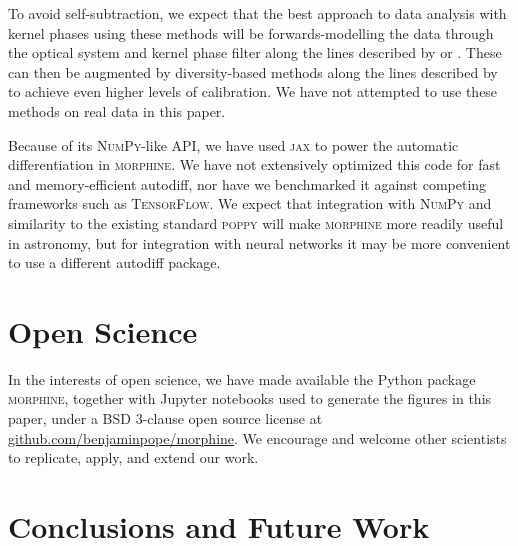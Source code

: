 \documentclass[modern]{aastex63}
\begin{document}
To avoid self-subtraction, we expect that the best approach to data analysis with kernel phases using these methods will be forwards-modelling the data through the optical system and kernel phase filter along the lines described by \citet{pueyo16} or \citet{martinache20}. These can then be augmented by diversity-based methods along the lines described by \citet{ireland13} to achieve even higher levels of calibration. We have not attempted to use these methods on real data in this paper.


Because of its \textsc{NumPy}-like API, we have used \textsc{jax} to power the automatic differentiation in \textsc{morphine}. We have not extensively optimized this code for fast and memory-efficient autodiff, nor have we benchmarked it against competing frameworks such as \textsc{TensorFlow}. We expect that integration with \textsc{NumPy} and similarity to the existing standard \textsc{poppy} will make \textsc{morphine} more readily useful in astronomy, but for integration with neural networks it may be more convenient to use a different autodiff package. 

\section{Open Science}
\label{sec:open}

In the interests of open science, we have made available the Python package \textsc{morphine}, together with Jupyter notebooks used to generate the figures in this paper, under a BSD 3-clause open source license at \href{https://github.com/benjaminpope/morphine}{github.com/benjaminpope/morphine}. We encourage and welcome other scientists to replicate, apply, and extend our work.

\section{Conclusions and Future Work}
\label{sec:conclusions}
\end{document}
